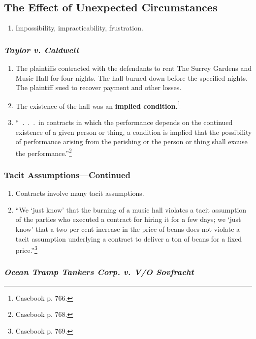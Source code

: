 \subsection{The Effect of Unexpected Circumstances}

\begin{enumerate}
    \item Impossibility, impracticability, frustration.
\end{enumerate}

\subsubsection{\emph{Taylor v. Caldwell}}

\begin{enumerate}
   \item The plaintiffs contracted with the defendants to rent The Surrey 
   Gardens and Music Hall for four nights. The hall burned down before the 
   specified nights. The plaintiff sued to recover payment and other losses.
    \item The existence of the hall was an \textbf{implied 
    condition}.\footnote{Casebook p. 766.}
    \item ``~.~.~.~in contracts in which the performance depends on the 
    continued existence of a given person or thing, a condition is implied 
    that the possibility of performance arising from the perishing or the 
    person or thing shall excuse the performance.''\footnote{Casebook p.  
    768.}
\end{enumerate}

\subsubsection{Tacit Assumptions---Continued}

\begin{enumerate}
    \item Contracts involve many tacit assumptions.
    \item \enquote{We `just know' that the burning of a music hall violates a 
    tacit assumption of the parties who executed a contract for hiring it for 
    a few days; we `just know' that a two per cent increase in the price of 
    beans does not violate a tacit assumption underlying a contract to deliver 
    a ton of beans for a fixed price.}\footnote{Casebook p. 769.}
\end{enumerate}

\subsubsection{\emph{Ocean Tramp Tankers Corp. v. V/O Sovfracht}}

